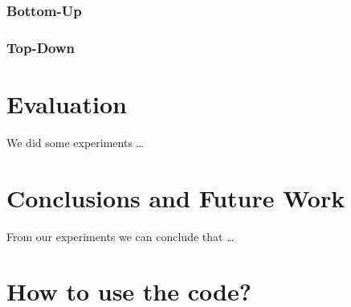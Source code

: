 \documentclass[a4paper, 11pt]{article}
\begin{document}
\subsubsection{Bottom-Up}
\label{bottomup}


\subsubsection{Top-Down}
\label{topdown}


\pagebreak













\section{Evaluation}

We did some experiments \ldots

\pagebreak













\section{Conclusions and Future Work}

From our experiments we can conclude that \ldots

\newpage













\appendix

\section{How to use the code?}
\end{document}
